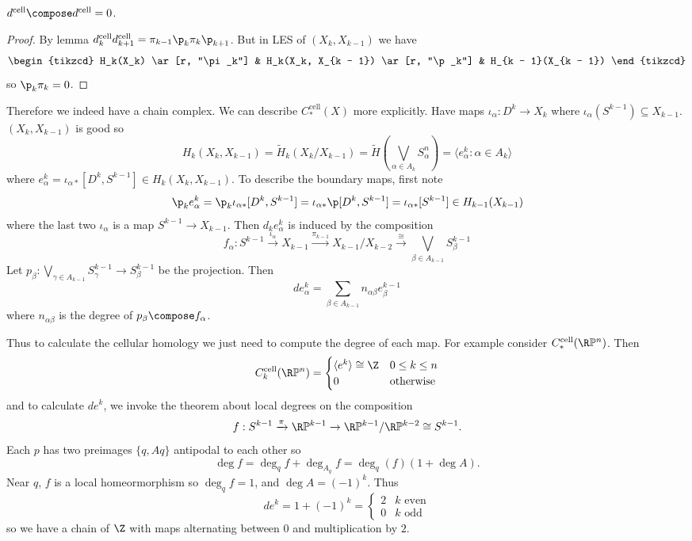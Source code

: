 \documentclass[a4paper]{article}
\renewcommand{\b}{\p}
\renewcommand*{\P}{\mathbb{P}}
\newcommand{\cell}{\mathrm{cell}}
\begin{document}
\begin{corollary}
  \(d^\cell \compose d^\cell = 0\).
\end{corollary}

\begin{proof}
  By lemma \(d_k^\cell d_{k + 1}^\cell = \pi_{k - 1} \b_k \pi_k \b_{k + 1}\). But in LES of \((X_k, X_{k - 1})\) we have
  \[
    \begin{tikzcd}
      H_k(X_k) \ar[r, "\pi_k"] & H_k(X_k, X_{k - 1}) \ar[r, "\b_k"] & H_{k - 1}(X_{k - 1})
    \end{tikzcd}
  \]
  so \(\b_k \pi_k = 0\).
\end{proof}

Therefore we indeed have a chain complex. We can describe \(C_*^\cell(X)\) more explicitly. Have maps \(\iota_\alpha: D^k \to X_k\) where \(\iota_\alpha(S^{k - 1}) \subseteq X_{k - 1}\). \((X_k, X_{k - 1})\) is good so
\[
  H_k(X_k, X_{k - 1}) = \widetilde H_k(X_k/X_{k - 1}) = \widetilde H(\bigvee_{\alpha \in A_k} S_\alpha^n) = \langle e_\alpha^k: \alpha \in A_k\rangle
\]
where \(e_\alpha^k = \iota_{\alpha*}[D^k, S^{k - 1}] \in H_k(X_k, X_{k - 1})\). To describe the boundary maps, first note
\[
  \b_k e_\alpha^k = \b_k \iota_{\alpha*} [D^k, S^{k - 1}] = \iota_{\alpha*} \b [D^k, S^{k - 1}] = \iota_{\alpha*}[S^{k - 1}] \in H_{k - 1}(X_{k - 1})
\]
where the last two \(\iota_\alpha\) is a map \(S^{k - 1} \to X_{k - 1}\). Then \(d_k e_\alpha^k\) is induced by the composition
\[
  f_\alpha: S^{k - 1} \xrightarrow{\iota_\alpha} X_{k - 1} \xrightarrow{\pi_{k - 1}} X_{k - 1}/X_{k - 2} \xrightarrow{\cong} \bigvee_{\beta \in A_{k - 1}} S^{k - 1}_\beta
\]
Let \(p_\beta: \bigvee_{\gamma \in A_{k - 1}} S_\gamma^{k - 1} \to S_\beta^{k - 1}\) be the projection. Then
\[
  d e_\alpha^k = \sum_{\beta \in A_{k - 1}} n_{\alpha\beta} e_\beta^{k - 1}
\]
where \(n_{\alpha\beta}\) is the degree of \(p_\beta \compose f_\alpha\).

Thus to calculate the cellular homology we just need to compute the degree of each map. For example consider \(C_*^\cell(\R\P^n)\). Then
\[
  C_k^\cell(\R\P^n) =
  \begin{cases}
    \langle e^k \rangle \cong \Z & 0 \leq k \leq n \\
    0 & \text{otherwise}
  \end{cases}
\]
and to calculate \(de^k\), we invoke the theorem about local degrees on the composition
\[
  f: S^{k - 1} \xrightarrow{\pi} \R\P^{k - 1} \to \R\P^{k - 1}/\R\P^{k - 2} \cong S^{k - 1}.
\]
Each \(p\) has two preimages \(\{q, Aq\}\) antipodal to each other so
\[
  \deg f = \deg_q f + \deg_{A_q} f = \deg_q(f) (1 + \deg A).
\]
Near \(q\), \(f\) is a local homeormorphism so \(\deg_q f = 1\), and \(\deg A = (-1)^k\). Thus
\[
  de^k = 1 + (-1)^k =
  \begin{cases}
    2 & k \text{ even} \\
    0 & k \text{ odd}
  \end{cases}
\]
so we have a chain of \(\Z\) with maps alternating between \(0\) and multiplication by \(2\).
\end{document}
